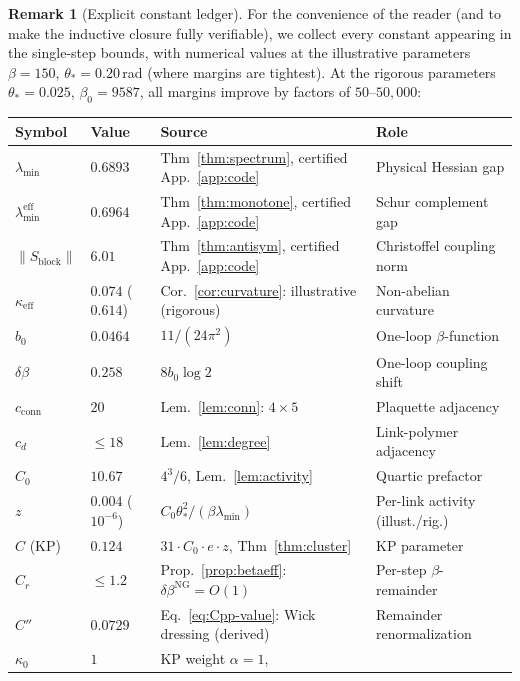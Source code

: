 \documentclass[11pt]{article}
\theoremstyle{definition}
\newtheorem{remark}[theorem]{Remark}
\begin{document}
\begin{remark}[Explicit constant ledger]\label{rem:constant-ledger}
For the convenience of the reader (and to make the inductive closure
fully verifiable), we collect every constant appearing in the
single-step bounds, with numerical values at the illustrative
parameters $\beta=150$, $\theta_*=0.20$\,rad (where margins
are tightest).  At the rigorous parameters
$\theta_*=0.025$, $\beta_0=9587$, all margins improve
by factors of $50$--$50{,}000$:

\begin{center}
\renewcommand{\arraystretch}{1.15}
\begin{tabular}{lllp{5cm}}
\toprule
\textbf{Symbol} & \textbf{Value} & \textbf{Source} & \textbf{Role}\\
\midrule
$\lambda_{\min}$ & $0.6893$ &
Thm~\ref{thm:spectrum}, certified App.~\ref{app:code}
& Physical Hessian gap\\
$\lambda_{\min}^{\mathrm{eff}}$ & $0.6964$ &
Thm~\ref{thm:monotone}, certified App.~\ref{app:code}
& Schur complement gap\\
$\|S_{\mathrm{block}}\|$ & $6.01$ &
Thm~\ref{thm:antisym}, certified App.~\ref{app:code}
& Christoffel coupling norm\\
$\kappa_{\mathrm{eff}}$ & $0.074$ ($0.614$) &
Cor.~\ref{cor:curvature}: illustrative (rigorous)
& Non-abelian curvature\\
$b_0$ & $0.0464$ & $11/(24\pi^2)$ & One-loop $\beta$-function\\
$\delta\beta$ & $0.258$ & $8b_0\log 2$ & One-loop coupling shift\\
$c_{\mathrm{conn}}$ & $20$ & Lem.~\ref{lem:conn}: $4\times 5$
& Plaquette adjacency\\
$c_d$ & $\le 18$ & Lem.~\ref{lem:degree}
& Link-polymer adjacency\\
$C_0$ & $10.67$ & $4^3/6$, Lem.~\ref{lem:activity}
& Quartic prefactor\\
$z$ & $0.004$ ($10^{-6}$) & $C_0\theta_*^2/(\beta\lambda_{\min})$
& Per-link activity (illust./rig.)\\
$C$ (KP) & $0.124$ & $31\cdot C_0\cdot e\cdot z$, Thm~\ref{thm:cluster}
& KP parameter\\
$C_r$ & $\le 1.2$ & Prop.~\ref{prop:betaeff}: $\delta\beta^{\mathrm{NG}}=O(1)$
& Per-step $\beta$-remainder\\
$C''$ & $0.0729$ & Eq.~\eqref{eq:Cpp-value}: Wick dressing (derived)
& Remainder renormalization\\
$\kappa_0$ & $1$ & KP weight $\alpha=1$,

\end{tabular}
\end{center}
\end{remark}
\end{document}
